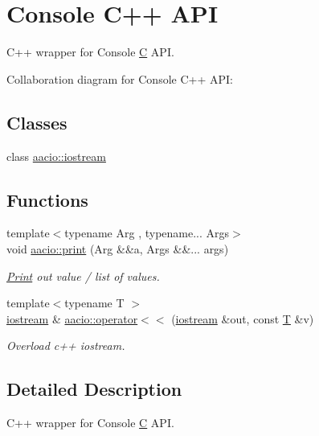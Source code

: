 \hypertarget{group__console_cppapi}{}\section{Console C++ A\+PI}
\label{group__console_cppapi}


C++ wrapper for Console \mbox{\hyperlink{struct_c}{C}} A\+PI.  


Collaboration diagram for Console C++ A\+PI\+:
\subsection*{Classes}
\begin{DoxyCompactItemize}
\item 
class \mbox{\hyperlink{classaacio_1_1iostream}{aacio\+::iostream}}
\end{DoxyCompactItemize}
\subsection*{Functions}
\begin{DoxyCompactItemize}
\item 
{\footnotesize template$<$typename Arg , typename... Args$>$ }\\void \mbox{\hyperlink{group__console_cppapi_ga2780132b8484a2674ef9254699d12968}{aacio\+::print}} (Arg \&\&a, Args \&\&... args)
\begin{DoxyCompactList}\small\item\em \mbox{\hyperlink{struct_print}{Print}} out value / list of values. \end{DoxyCompactList}\item 
{\footnotesize template$<$typename T $>$ }\\\mbox{\hyperlink{classaacio_1_1iostream}{iostream}} \& \mbox{\hyperlink{group__console_cppapi_ga9573031ece85c11fb0baeaab3a36eb73}{aacio\+::operator$<$$<$}} (\mbox{\hyperlink{classaacio_1_1iostream}{iostream}} \&out, const \mbox{\hyperlink{struct_t}{T}} \&v)
\begin{DoxyCompactList}\small\item\em Overload c++ iostream. \end{DoxyCompactList}\end{DoxyCompactItemize}


\subsection{Detailed Description}
C++ wrapper for Console \mbox{\hyperlink{struct_c}{C}} A\+PI. 

